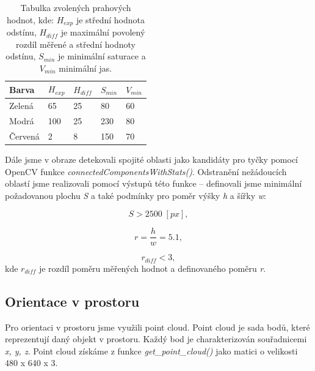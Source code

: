 \documentclass{article}
\begin{document}
\vspace{0.5cm}

\begin{table}[h]
\centering
\begin{tabular}{lllll}
\hline
\bf{Barva} & \bf{$H_{exp}$} & \bf{$H_{diff}$} & \bf{$S_{min}$} & \bf{$V_{min}$}\\
\hline
Zelená & 65 & 25 & 80 & 60 \\
\hline
Modrá & 100 & 25 & 230 & 80 \\
\hline
Červená & 2 & 8 & 150 & 70 \\
\hline


\end{tabular}

\caption{Tabulka zvolených prahových hodnot, kde: $H_{exp}$ je střední hodnota odstínu, $H_{diff}$ je maximální povolený rozdíl měřené a střední hodnoty odstínu, $S_{min}$ je minimální saturace a $V_{min}$ minimální jas.}

\end{table}

\vspace{0.7cm}

	Dále jsme v obraze detekovali spojité oblasti jako kandidáty pro tyčky pomocí OpenCV funkce {\it connectedComponentsWithStats()}. Odstranění nežádoucích oblastí jsme realizovali pomocí výstupů této funkce -- definovali jsme minimální požadovanou plochu {\it S} a také podmínky pro poměr výšky {\it h} a šířky {\it w}:
	
\begin{equation}
	S > 2500 \; [px],
\end{equation}

\begin{equation}
	r = \frac{h}{w} = 5.1,
\end{equation}

\begin{equation}
	r_{diff} < 3,
\end{equation}
	kde $r_{diff}$ je rozdíl poměru měřených hodnot a definovaného poměru {\it r}. 

\subsection{Orientace v prostoru}

	Pro orientaci v prostoru jsme využili point cloud. Point cloud je sada bodů, které reprezentují daný objekt v prostoru. Každý bod je charakterizován souřadnicemi {\it x, y, z}. Point cloud získáme z funkce {\it get\_point\_cloud()} jako matici o velikosti 480 x 640 x 3. 
	
\end{document}
